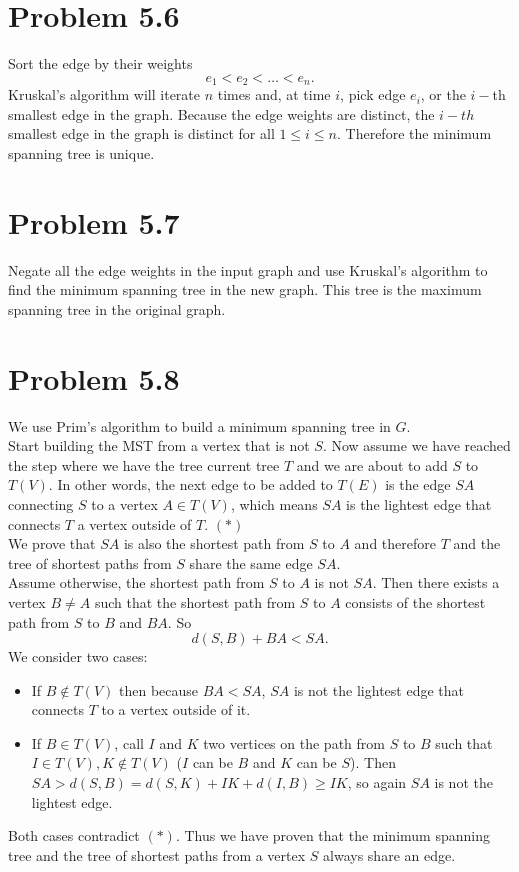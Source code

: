 \documentclass[12pt]{report}
\begin{document}
\section{Problem 5.6}
Sort the edge by their weights $$e_1 < e_2 < \ldots < e_n.$$
Kruskal's algorithm will iterate $n$ times and, at time $i$, pick edge $e_i$, or the $i-$th smallest edge in the graph. Because the edge weights are distinct, the $i-th$ smallest edge in the graph is distinct for all $1 \le i \le n$. Therefore the minimum spanning tree is unique.

\section{Problem 5.7}
Negate all the edge weights in the input graph and use Kruskal's algorithm to find the minimum spanning tree in the new graph. This tree is the maximum spanning tree in the original graph.

\section{Problem 5.8}
We use Prim's algorithm to build a minimum spanning tree in $G$. \\
Start building the MST from a vertex that is not $S$. Now assume we have reached the step where we have the tree current tree $T$ and we are about to add $S$ to $T(V)$. In other words, the next edge to be added to $T(E)$ is the edge $SA$ connecting $S$ to a vertex $A \in T(V)$, which means $SA$ is the lightest edge that connects $T$ a vertex outside of $T$. $(*)$\\
We prove that $SA$ is also the shortest path from $S$ to $A$ and therefore $T$ and the tree of shortest paths from $S$ share the same edge $SA$. \\
Assume otherwise, the shortest path from $S$ to $A$ is not $SA$. Then there exists a vertex $B \ne A$ such that the shortest path from $S$ to $A$ consists of the shortest path from $S$ to $B$ and $BA$. So $$d(S,B) + BA < SA.$$
We consider two cases:
\begin{itemize}
  \item If $B \notin T(V)$ then because $BA < SA$, $SA$ is not the lightest edge that connects $T$ to a vertex outside of it.
  \item If $B \in T(V)$, call $I$ and $K$ two vertices on the path from $S$ to $B$ such that $I \in T(V), K \notin T(V)$ ($I$ can be $B$ and $K$ can be $S$). Then $SA > d(S,B) = d(S,K) + IK + d(I,B) \ge IK$, so again $SA$ is not the lightest edge.
\end{itemize}
Both cases contradict $(*)$. Thus we have proven that the minimum spanning tree and the tree of shortest paths from a vertex $S$ always share an edge.
\end{document}
